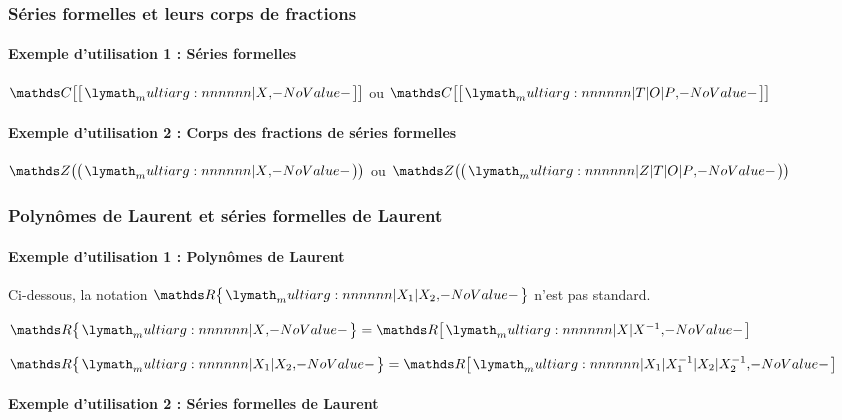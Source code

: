 \documentclass[12pt,a4paper]{article}
\theoremstyle{definition}
\begin{document}
\subsubsection{Séries formelles et leurs corps de fractions}

\paragraph{Exemple d'utilisation 1 : Séries formelles}

\begin{latexex}
$\setserie{\CC}{X}$ ou
$\setserie{\CC}{T | O | P}$
\end{latexex}




\paragraph{Exemple d'utilisation 2 : Corps des fractions de séries formelles}

\begin{latexex}
$\setseriefrac{\ZZ}{X}$ ou
$\setseriefrac{\ZZ}{Z | T | O | P}$
\end{latexex}




\subsubsection{Polynômes de Laurent et séries formelles de Laurent}

\paragraph{Exemple d'utilisation 1 : Polynômes de Laurent}

Ci-dessous, la notation $\setpolylaurent{\RR}{X_1 | X_2}$ n'est pas standard.

\begin{latexex}
$\setpolylaurent{\RR}{X}
 = \setpoly{\RR}{X | X^{-1}}$

$\setpolylaurent{\RR}{X_1 | X_2}
 = \setpoly{\RR}%
           {X_1 | X_1^{-1} %
            | X_2 | X_2^{-1}}$
\end{latexex}




\paragraph{Exemple d'utilisation 2 : Séries formelles de Laurent}
\end{document}
